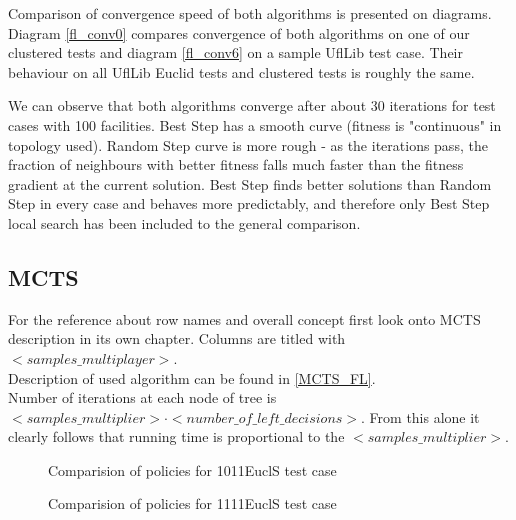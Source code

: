 Comparison of convergence speed of both algorithms is presented on diagrams.
Diagram \ref{fl_conv0} compares convergence of both algorithms on one of our clustered tests
and diagram \ref{fl_conv6} on a sample UflLib test case. Their behaviour on all UflLib Euclid
tests and clustered tests is roughly the same.

We can observe that both algorithms converge after about 30 iterations for test cases with
100 facilities. Best Step has a smooth curve (fitness is "continuous" in topology used).
Random Step curve is more rough - as the iterations pass, the fraction of neighbours with better fitness
falls much faster than the fitness gradient at the current solution.
Best Step finds better solutions than Random Step in every case and behaves more predictably,
and therefore only Best Step local search has been included to the general comparison.

\FloatBarrier


\FloatBarrier

\begin{figure}[ht]
  
\end{figure}

\subsection{MCTS}

For the reference about row names and overall concept first look onto MCTS description in its own chapter.
Columns are titled with $<samples\_multiplayer>$. \\
Description of used algorithm can be found in \ref{MCTS_FL}. \\
Number of iterations at each node of tree is $<samples\_multiplier> \cdot <number\_of\_left\_decisions>$.
From this alone it clearly follows that running time is proportional to the $<samples\_multiplier>$.

\FloatBarrier
\begin{figure}[ht]
  
  \caption{Comparision of policies for 1011EuclS test case}
\end{figure}

\begin{figure}[ht]
  
  \caption{Comparision of policies for 1111EuclS test case}
\end{figure}

